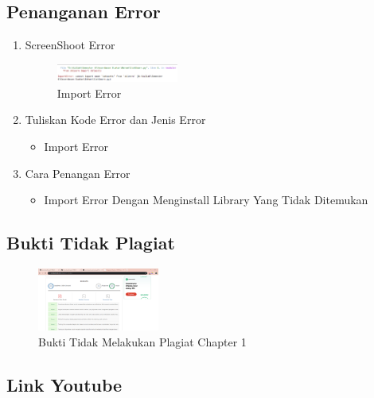 \subsection{Penanganan Error}
\begin{enumerate}
	\item ScreenShoot Error
	\begin{figure}[H]
		\includegraphics[width=4cm]{figures/1174069/1/error/1.png}
		\centering
		\caption{Import Error}
	\end{figure}

	\item Tuliskan Kode Error dan Jenis Error
	\begin{itemize}
		\item Import Error
	\end{itemize}
	\item Cara Penangan Error
	\begin{itemize}
		\item Import Error
		\hfill\break
		Dengan Menginstall Library Yang Tidak Ditemukan
	\end{itemize}
\end{enumerate}

\subsection{Bukti Tidak Plagiat}
\begin{figure}[H]
	\includegraphics[width=4cm]{figures/1174069/1/plagiat/plagiat.png}
	\centering
	\caption{Bukti Tidak Melakukan Plagiat Chapter 1}
\end{figure}

\subsection{Link Youtube}

